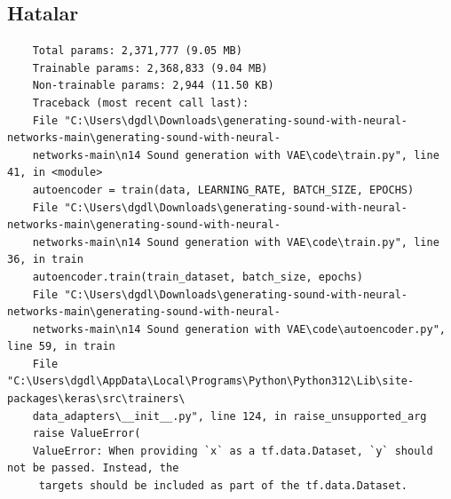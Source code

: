 \documentclass[12pt, a4paper]{article}
\begin{document}
	\subsection{Hatalar} 	\vspace*{1\baselineskip}
	\begin{verbatim}
	Total params: 2,371,777 (9.05 MB)
	Trainable params: 2,368,833 (9.04 MB)
	Non-trainable params: 2,944 (11.50 KB)
	Traceback (most recent call last):
	File "C:\Users\dgdl\Downloads\generating-sound-with-neural-networks-main\generating-sound-with-neural-
	networks-main\n14 Sound generation with VAE\code\train.py", line 41, in <module>
	autoencoder = train(data, LEARNING_RATE, BATCH_SIZE, EPOCHS)
	File "C:\Users\dgdl\Downloads\generating-sound-with-neural-networks-main\generating-sound-with-neural-
	networks-main\n14 Sound generation with VAE\code\train.py", line 36, in train
	autoencoder.train(train_dataset, batch_size, epochs)
	File "C:\Users\dgdl\Downloads\generating-sound-with-neural-networks-main\generating-sound-with-neural-
	networks-main\n14 Sound generation with VAE\code\autoencoder.py", line 59, in train
	File "C:\Users\dgdl\AppData\Local\Programs\Python\Python312\Lib\site-packages\keras\src\trainers\
	data_adapters\__init__.py", line 124, in raise_unsupported_arg
	raise ValueError(
	ValueError: When providing `x` as a tf.data.Dataset, `y` should not be passed. Instead, the
	 targets should be included as part of the tf.data.Dataset.  
	\end{verbatim}
	
\end{document}
